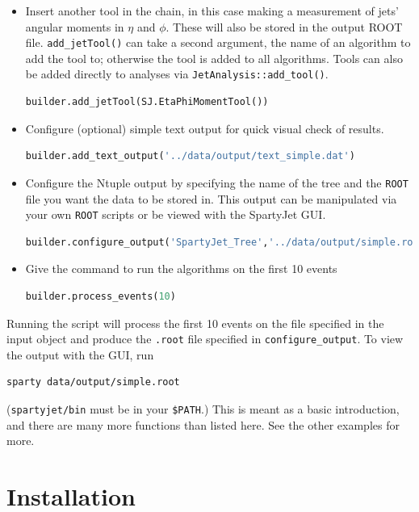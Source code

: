 \documentclass{article}
\newcommand{\prog}[1]{{\sc #1}\xspace}
\newcommand{\code}[1]{{\tt #1}\xspace}
\newcommand{\SJ}[0]{\prog{SpartyJet}}
\begin{document}
\begin{itemize}
 \item Insert another tool in the chain, in this case making a measurement of jets' angular moments in $\eta$ and $\phi$.  These will also be stored in the output \prog{ROOT} file.  \code{add\_jetTool()} can take a second argument, the name of an algorithm to add the tool to; otherwise the tool is added to all algorithms.  Tools can also be added directly to analyses via \code{JetAnalysis::add\_tool()}.
\begin{lstlisting}[language=Python]
builder.add_jetTool(SJ.EtaPhiMomentTool())
\end{lstlisting} 
 
\item  Configure (optional) simple text output for quick visual check of results.
\begin{lstlisting}[language=Python]
builder.add_text_output('../data/output/text_simple.dat')
\end{lstlisting}

\item Configure the Ntuple output by specifying the name of the tree and the \code{ROOT} file you want the data to be stored in.  This output can be manipulated via your own \code{ROOT} scripts or be viewed with the \SJ GUI. 
\begin{lstlisting}[language=Python]
builder.configure_output('SpartyJet_Tree','../data/output/simple.root')
\end{lstlisting}

\item Give the command to run the algorithms on the first 10
events 
\begin{lstlisting}[language=Python]
builder.process_events(10)
\end{lstlisting}

\end{itemize}

Running the script will process the first 10 events on the file specified in the input object and produce the \verb+.root+ file specified in \code{configure\_output}.  To view the output with the GUI, run
\begin{verbatim}
sparty data/output/simple.root
\end{verbatim}
(\verb+spartyjet/bin+ must be in your \verb+$PATH+.)  This is meant as a basic introduction, and there are many more functions than listed here.  See the other examples for more.


\section{Installation}
\label{f0:Installation}
\end{document}
